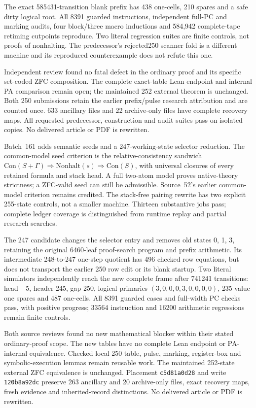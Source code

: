 \documentclass[11pt]{article}
\begin{document}
{The exact 585431-transition blank prefix has 438 one-cells, 210 spares and a safe
dirty logical root. All 8391 guarded instructions, independent full-PC and
marking audits, four block/three macro inductions and 584,942 complete-tape
retiming cutpoints reproduce. Two literal regression suites are finite controls,
not proofs of nonhalting. The predecessor's rejected250 scanner fold is a
different machine and its reproduced counterexample does not refute this one.

Independent review found no fatal defect in the ordinary proof and its specific
set-coded ZFC composition. The complete exact-table Lean endpoint and internal PA
comparison remain open; the maintained 252 external theorem is unchanged.
Both 250 submissions retain the earlier prefix/pulse research attribution and
are counted once. 633 ancillary files and 22 archive-only files have complete
recovery maps. All requested predecessor, construction and audit suites pass
on isolated copies. No delivered article or PDF is rewritten.

Batch~161 adds semantic seeds and a 247-working-state selector reduction.
The common-model seed criterion is the relative-consistency sandwich
$\mathrm{Con}(S+\Gamma)\Rightarrow\mathrm{Nonhalt}(s)\Rightarrow\mathrm{Con}(S)$,
with universal closures of every retained formula and stack head. A full
two-atom model proves native-theory strictness; a ZFC-valid seed can still be
admissible. Source~52's earlier common-model criterion remains credited.
The stack-free pairing rewrite has two explicit 255-state controls, not a
smaller machine. Thirteen substantive jobs pass; complete ledger coverage
is distinguished from runtime replay and partial research searches.

The 247 candidate changes the selector entry and removes old states 0, 1, 3,
retaining the original 6460-leaf proof-search program and prefix arithmetic.
Its intermediate 248-to-247 one-step quotient has 496 checked row equations,
but does not transport the earlier 250 row edit or its blank startup.
Two literal simulators independently reach the new complete frame after
741241 transitions: head $-5$, header 245, gap 250, logical primaries
$(3,0,0,0,3,0,0,0,0)$, 235 value-one spares and 487 one-cells.
All 8391 guarded cases and full-width PC checks pass, with positive progress;
33564 instruction and 16200 arithmetic regressions remain finite controls.

Both source reviews found no new mathematical blocker within their stated
ordinary-proof scope. The new tables have no complete Lean endpoint or
PA-internal equivalence. Checked local 250 table, pulse, marking, register-box
and symbolic-execution lemmas remain reusable work. The maintained 252-state
external ZFC equivalence is unchanged. Placement \texttt{c5d81a0d28} and write
\texttt{120b8a92dc} preserve 263 ancillary and 20 archive-only files, exact
recovery maps, fresh evidence and inherited-record distinctions. No delivered
article or PDF is rewritten.

}
\end{document}
